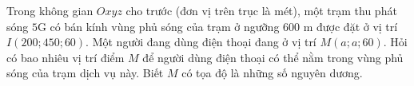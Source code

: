 \begin{bt}%
	Trong không gian $Oxyz$ cho trước (đơn vị trên trục là mét), một trạm thu phát sóng $5$G có bán kính vùng phủ sóng của trạm ở ngưỡng $600$ m được đặt ở vị trí $I(200 ; 450 ; 60)$. Một người đang dùng điện thoại đang ở vị trí $M(a ; a ; 60)$. Hỏi có bao nhiêu vị trí điểm $M$ để người dùng điện thoại có thể nằm trong vùng phủ sóng của trạm dịch vụ này. Biết $M$ có tọa độ là những số nguyên dương.
\end{bt}

